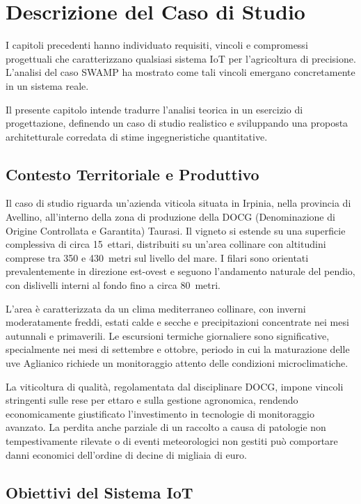 \section{Descrizione del Caso di Studio}

I capitoli precedenti hanno individuato requisiti, vincoli e compromessi progettuali che caratterizzano qualsiasi sistema IoT per l'agricoltura di precisione. L'analisi del caso SWAMP ha mostrato come tali vincoli emergano concretamente in un sistema reale.

Il presente capitolo intende tradurre l'analisi teorica in un esercizio di progettazione, definendo un caso di studio realistico e sviluppando una proposta architetturale corredata di stime ingegneristiche quantitative. 

\subsection{Contesto Territoriale e Produttivo}

Il caso di studio riguarda un'azienda viticola situata in Irpinia, nella provincia di Avellino, all'interno della zona di produzione della DOCG (Denominazione di Origine Controllata e Garantita) Taurasi. Il vigneto si estende su una superficie complessiva di circa 15~ettari, distribuiti su un'area collinare con altitudini comprese tra 350 e 430~metri sul livello del mare. I filari sono orientati prevalentemente in direzione est-ovest e seguono l'andamento naturale del pendio, con dislivelli interni al fondo fino a circa 80~metri.

L'area è caratterizzata da un clima mediterraneo collinare, con inverni moderatamente freddi, estati calde e secche e precipitazioni concentrate nei mesi autunnali e primaverili. Le escursioni termiche giornaliere sono significative, specialmente nei mesi di settembre e ottobre, periodo in cui la maturazione delle uve Aglianico richiede un monitoraggio attento delle condizioni microclimatiche.

La viticoltura di qualità, regolamentata dal disciplinare DOCG, impone vincoli stringenti sulle rese per ettaro e sulla gestione agronomica, rendendo economicamente giustificato l'investimento in tecnologie di monitoraggio avanzato. La perdita anche parziale di un raccolto a causa di patologie non tempestivamente rilevate o di eventi meteorologici non gestiti può comportare danni economici dell'ordine di decine di migliaia di euro.

\subsection{Obiettivi del Sistema IoT}

